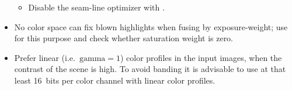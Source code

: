\begin{itemize}
\begin{itemize}
    \item
      Disable the seam-line optimizer with .
    \end{itemize}
\fi%

\ifenfuse
  \item
     No color space can fix blown highlights when
    fusing by exposure-weight; use
     for this purpose and check
    whether saturation weight is zero.
\fi%

  \item
    Prefer linear (i.e.\ $\mathrm{gamma} = 1$) color profiles in the input images, when the
    contrast of the scene is high.  To avoid banding it is advisable to use at that least
    16~bits per color channel with linear color profiles.

\end{itemize}



